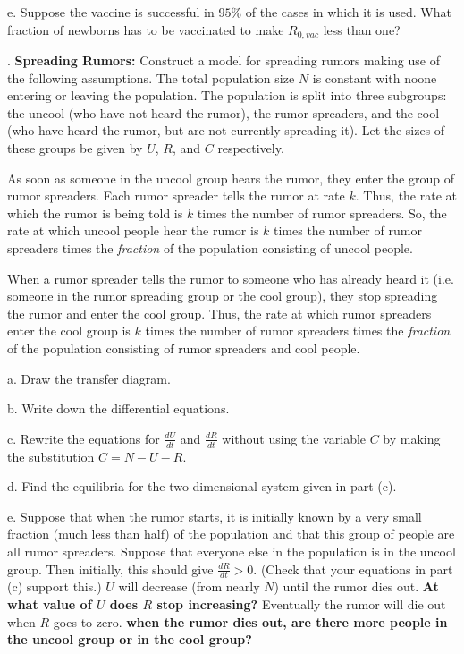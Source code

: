 \documentclass[reqno,12pt]{amsart}
\begin{document}
\bigskip
\noindent
e.  Suppose the vaccine is successful in $95 \%$ of the cases in which
it is used.  What fraction of newborns has to be vaccinated to make
$R_{0,vac}$ less than one?




\newpage
{}.  {\bf Spreading Rumors:}  Construct a model for spreading rumors making
use of the following assumptions.  The total population size $N$ is
constant with noone entering or leaving the population.  The population
is split into three subgroups: the uncool (who have not heard the rumor),
the rumor spreaders, and the cool (who have heard the rumor, but are not
currently spreading it).  Let the sizes of these groups be given by $U$,
$R$, and $C$ respectively.

As soon as someone in the uncool group hears the rumor, they enter the
group of rumor spreaders.  Each rumor spreader tells the rumor at rate
$k$.  Thus, the rate at which the rumor is being told is $k$ times the
number of rumor spreaders.  So, the rate at which uncool people hear the
rumor is $k$ times the number of rumor spreaders times the {\it fraction}
of the population consisting of uncool people.

When a rumor spreader tells the rumor to someone who has already heard
it (i.e. someone in the rumor spreading group or the cool group), they
stop spreading the rumor and enter the cool group.  Thus, the rate at
which rumor spreaders enter the cool group is $k$ times the number of
rumor spreaders times the {\it fraction} of the population consisting
of rumor spreaders and cool people.

\vspace{1cm}

\noindent
a.  Draw the transfer diagram.

\bigskip
\noindent
b.  Write down the differential equations.

\bigskip
\noindent
c.  Rewrite the equations for $\frac{dU}{dt}$ and $\frac{dR}{dt}$
without using the variable $C$ by making the substitution $C=N-U-R$.

\bigskip
\noindent
d.  Find the equilibria for the two dimensional system given in part (c).

\bigskip
\noindent
e.  Suppose that when the rumor starts, it is initially known by a
very small fraction (much less than half) of the population and that
this group of people are all rumor spreaders.  Suppose that everyone
else in the population is in the uncool group.  Then initially, this
should give $\frac{dR}{dt}>0$.  (Check that your equations in part (c)
support this.)  $U$ will decrease (from nearly $N$) until the rumor
dies out.  {\bf At what value of $U$ does $R$ stop increasing?}
Eventually the rumor will die out when $R$ goes to zero. {\bf when the
rumor dies out, are there more people in the uncool group or in the
cool group?}
\end{document}
